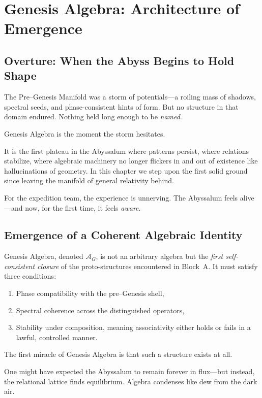 
\chapter{Genesis Algebra: Architecture of Emergence}
\label{ch:genesis-algebra}

\section*{Overture: When the Abyss Begins to Hold Shape}
The Pre--Genesis Manifold was a storm of potentials---a roiling mass of shadows, spectral seeds,
and phase-consistent hints of form. But no structure in that domain endured. Nothing held long
enough to be \emph{named}.

Genesis Algebra is the moment the storm hesitates.

It is the first plateau in the Abyssalum where patterns persist, where relations stabilize,
where algebraic machinery no longer flickers in and out of existence like hallucinations of
geometry. In this chapter we step upon the first solid ground since leaving the manifold of
general relativity behind.

For the expedition team, the experience is unnerving.
The Abyssalum feels alive---and now, for the first time, it feels \emph{aware}.

\section{Emergence of a Coherent Algebraic Identity}
Genesis Algebra, denoted $\mathcal{A}_G$, is not an arbitrary algebra but the \emph{first
self-consistent closure} of the proto-structures encountered in Block~A. It must satisfy three
conditions:

\begin{enumerate}
  \item Phase compatibility with the pre--Genesis shell,
  \item Spectral coherence across the distinguished operators,
  \item Stability under composition, meaning associativity either holds or fails in a lawful,
        controlled manner.
\end{enumerate}

The first miracle of Genesis Algebra is that such a structure exists at all.

One might have expected the Abyssalum to remain forever in flux---but instead, the relational
lattice finds equilibrium. Algebra condenses like dew from the dark air.

